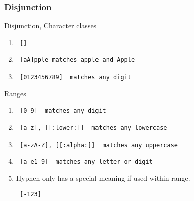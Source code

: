 \documentclass[compress, black]{beamer}
\begin{document}
\begin{frame}[fragile]
	\frametitle{Disjunction}
	\begin{large_enum}
		\item[-]<1->Disjunction, Character classes
				\begin{enumerate}
				\item[-]<2-> \begin{verbatim} [] \end{verbatim}
				\item[-]<3-> \begin{verbatim} [aA]pple matches apple and Apple \end{verbatim}
				\item[-]<4-> \begin{verbatim} [0123456789]  matches any digit \end{verbatim}
				\end{enumerate}
		\item[-]<5->Ranges
			\begin{enumerate}
				\item[-]<6-> \begin{verbatim} [0-9]  matches any digit \end{verbatim}
				\item[-]<7-> \begin{verbatim} [a-z], [[:lower:]]  matches any lowercase \end{verbatim}
				\item[-]<8-> \begin{verbatim} [a-zA-Z], [[:alpha:]]  matches any uppercase \end{verbatim}
				\item[-]<9-> \begin{verbatim} [a-e1-9]  matches any letter or digit \end{verbatim}
				\item[-]<10-> Hyphen only has a special meaning if used within range. \begin{verbatim} [-123] \end{verbatim}
			\end{enumerate}
	\end{large_enum}
\end{frame}
\end{document}
